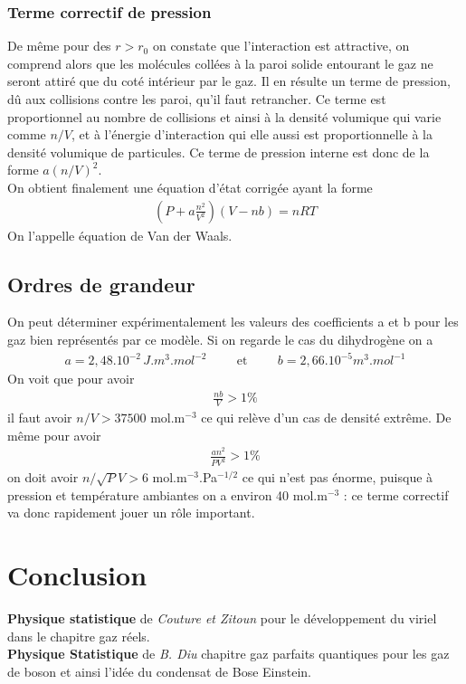 \documentclass[12pt,prb,aps,epsf]{article}
\begin{document}
\subsubsection{Terme correctif de pression}
De même pour des $r>r_0$ on constate que l'interaction est attractive, on comprend alors que les molécules collées à la paroi solide entourant le gaz ne seront attiré que du coté intérieur par le gaz. Il en résulte un terme de pression, dû aux collisions contre les paroi, qu'il faut retrancher. Ce terme est proportionnel au nombre de collisions et ainsi à la densité volumique qui varie comme $n/V$, et à l'énergie d'interaction qui elle aussi est proportionnelle à la densité volumique de particules. Ce terme de pression interne est donc de la forme $a(n/V)^2$.\\
On obtient finalement une équation d'état corrigée ayant la forme 
\begin{eqnarray}
\left(P + a\frac{n^2}{V^2}\right)(V-nb) = nRT
\end{eqnarray}
On l'appelle équation de Van der Waals.

\subsection{Ordres de grandeur}
On peut déterminer expérimentalement les valeurs des coefficients a et b pour les gaz bien représentés par ce modèle. Si on regarde le cas du dihydrogène on a 
\begin{eqnarray}
a = 2,48.10^{-2} \,J.m^{3}.mol^{-2}\hspace{1cm}\mathrm{et}\hspace{1cm} b = 2,66.10^{-5}m^3.mol^{-1}
\end{eqnarray}
On voit que pour avoir 
\begin{eqnarray}
\frac{nb}{V} > 1\%
\end{eqnarray}
il faut avoir $n/V > 37500$ mol.m$^{-3}$ ce qui relève d'un cas de densité extrême. De même pour avoir 
\begin{eqnarray}
\frac{an^2}{PV^2} > 1\% 
\end{eqnarray}
on doit avoir $n/\sqrt{P}V > 6$ mol.m$^{-3}$.Pa$^{-1/2}$ ce qui n'est pas énorme, puisque à pression et température ambiantes on a environ 40 mol.m$^{-3}$ : ce terme correctif va donc rapidement jouer un rôle important.

\section*{Conclusion}
\textbf{Physique statistique} de \textit{Couture et Zitoun} pour le développement du viriel dans le chapitre gaz réels.\\
\textbf{Physique Statistique} de \textit{B. Diu} chapitre gaz parfaits quantiques pour les gaz de boson et ainsi l'idée du condensat de Bose Einstein.\\
\end{document}
